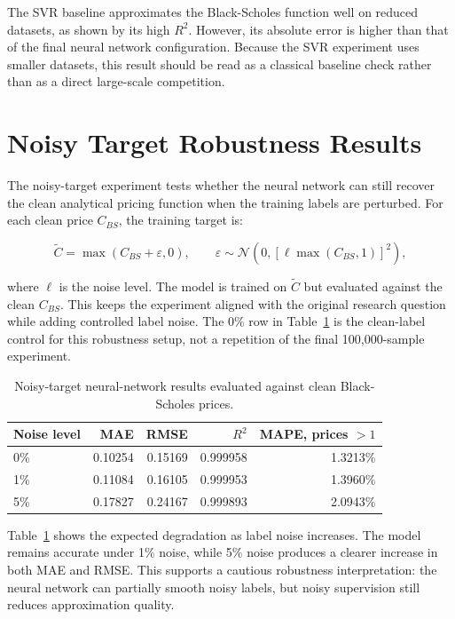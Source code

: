 The SVR baseline approximates the Black-Scholes function well on reduced datasets, as shown by its high $R^2$.
However, its absolute error is higher than that of the final neural network configuration.
Because the SVR experiment uses smaller datasets, this result should be read as a classical baseline check rather than as a direct large-scale competition.

\section{Noisy Target Robustness Results}

The noisy-target experiment tests whether the neural network can still recover the clean analytical pricing function when the training labels are perturbed.
For each clean price $C_{BS}$, the training target is:

\begin{equation}
    \tilde{C}
    =
    \max\left(
        C_{BS} + \varepsilon,
        0
    \right),
    \qquad
    \varepsilon
    \sim
    \mathcal{N}\left(0, \left[\ell \max(C_{BS}, 1)\right]^2\right),
\end{equation}

where $\ell$ is the noise level.
The model is trained on $\tilde{C}$ but evaluated against the clean $C_{BS}$.
This keeps the experiment aligned with the original research question while adding controlled label noise.
The 0\% row in Table~\ref{tab:noisy-targets} is the clean-label control for this robustness setup, not a repetition of the final 100,000-sample experiment.

\begin{table}[H]
    \centering
    \begin{tabular}{lrrrr}
        \toprule
        Noise level & MAE     & RMSE    & $R^2$    & MAPE, prices $> 1$ \\
        \midrule
        0\%         & 0.10254 & 0.15169 & 0.999958 & 1.3213\%           \\
        1\%         & 0.11084 & 0.16105 & 0.999953 & 1.3960\%           \\
        5\%         & 0.17827 & 0.24167 & 0.999893 & 2.0943\%           \\
        \bottomrule
    \end{tabular}
    \caption{Noisy-target neural-network results evaluated against clean Black-Scholes prices.}
    \label{tab:noisy-targets}
\end{table}

Table~\ref{tab:noisy-targets} shows the expected degradation as label noise increases.
The model remains accurate under 1\% noise, while 5\% noise produces a clearer increase in both MAE and RMSE.
This supports a cautious robustness interpretation: the neural network can partially smooth noisy labels, but noisy supervision still reduces approximation quality.

